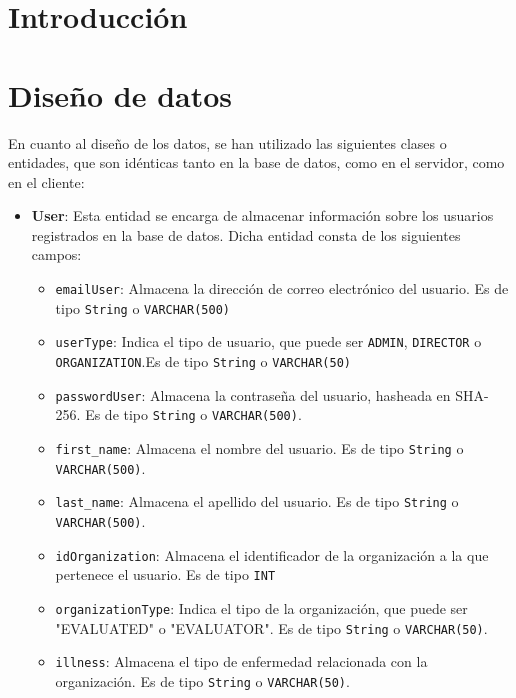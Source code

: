 
\section{Introducción}

\section{Diseño de datos}
En cuanto al diseño de los datos, se han utilizado las siguientes clases o entidades, que son idénticas tanto en la base de datos, como en el servidor, como en el cliente:
\begin{itemize}
    
    \item \textbf{User}: Esta entidad se encarga de almacenar información sobre los usuarios registrados en la base de datos. Dicha entidad consta de los siguientes campos:
    \begin{itemize}
        \item \texttt{emailUser}: Almacena la dirección de correo electrónico del usuario. Es de tipo \texttt{String} o \texttt{VARCHAR(500)}
        \item \texttt{userType}: Indica el tipo de usuario, que puede ser \texttt{ADMIN}, \texttt{DIRECTOR} o \texttt{ORGANIZATION}.Es de tipo \texttt{String} o \texttt{VARCHAR(50)}
        \item \texttt{passwordUser}: Almacena la contraseña del usuario, hasheada en SHA-256. Es de tipo \texttt{String} o \texttt{VARCHAR(500)}.
        \item \texttt{first\_name}: Almacena el nombre del usuario. Es de tipo \texttt{String} o \texttt{VARCHAR(500)}.
        \item \texttt{last\_name}: Almacena el apellido del usuario. Es de tipo \texttt{String} o \texttt{VARCHAR(500)}.
        \item \texttt{idOrganization}: Almacena el identificador de la organización a la
        que pertenece el usuario. Es de tipo \texttt{INT}
        \item \texttt{organizationType}: Indica el tipo de la organización, que
        puede ser "EVALUATED" o "EVALUATOR". Es de tipo \texttt{String} o \texttt{VARCHAR(50)}.
        \item \texttt{illness}: Almacena el tipo de enfermedad relacionada con
        la organización. Es de tipo \texttt{String} o \texttt{VARCHAR(50)}.

\end{itemize}
\end{itemize}
